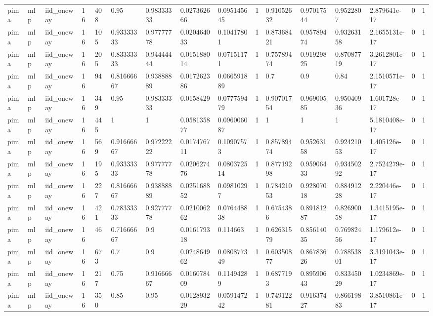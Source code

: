 \begin{tabular}{llllllllllllllll}
pima & mlp & iid\_oneway & 16 & 408 & 0.95 & 0.98333333 & 0.027362666 & 0.095145645 & 1 & 0.91052632 & 0.97017544 & 0.9522807 & 2.879641e-17 & 0 & 1 \\
pima & mlp & iid\_oneway & 16 & 105 & 0.93333333 & 0.97777778 & 0.020464033 & 0.10417801 & 1 & 0.87368421 & 0.95789474 & 0.93263158 & 2.1655131e-17 & 0 & 1 \\
pima & mlp & iid\_oneway & 16 & 205 & 0.83333333 & 0.94444444 & 0.015188014 & 0.07151171 & 1 & 0.75789474 & 0.91929825 & 0.87087719 & 3.2612801e-17 & 0 & 1 \\
pima & mlp & iid\_oneway & 16 & 94 & 0.81666667 & 0.93888889 & 0.017262386 & 0.066591889 & 1 & 0.7 & 0.9 & 0.84 & 2.1510571e-17 & 0 & 1 \\
pima & mlp & iid\_oneway & 16 & 349 & 0.95 & 0.98333333 & 0.0158429 & 0.077759479 & 1 & 0.90701754 & 0.96900585 & 0.95040936 & 1.601728e-17 & 0 & 1 \\
pima & mlp & iid\_oneway & 16 & 445 & 1 & 1 & 0.058135877 & 0.096006087 & 1 & 1 & 1 & 1 & 5.1810408e-17 & 0 & 1 \\
pima & mlp & iid\_oneway & 16 & 569 & 0.91666667 & 0.97222222 & 0.017476711 & 0.10907573 & 1 & 0.85789474 & 0.95263158 & 0.92421053 & 1.405126e-17 & 0 & 1 \\
pima & mlp & iid\_oneway & 16 & 195 & 0.93333333 & 0.97777778 & 0.020627476 & 0.080372514 & 1 & 0.87719298 & 0.95906433 & 0.93450292 & 2.7524279e-17 & 0 & 1 \\
pima & mlp & iid\_oneway & 16 & 227 & 0.81666667 & 0.93888889 & 0.025168852 & 0.09810297 & 1 & 0.78421053 & 0.92807018 & 0.88491228 & 2.220446e-17 & 0 & 1 \\
pima & mlp & iid\_oneway & 16 & 421 & 0.78333333 & 0.92777778 & 0.021006262 & 0.076448838 & 1 & 0.6754386 & 0.89181287 & 0.82690058 & 1.3415195e-17 & 0 & 1 \\
pima & mlp & iid\_oneway & 16 & 46 & 0.71666667 & 0.9 & 0.016179318 & 0.114663 & 1 & 0.62631579 & 0.85614035 & 0.76982456 & 1.179612e-17 & 0 & 1 \\
pima & mlp & iid\_oneway & 16 & 673 & 0.7 & 0.9 & 0.024864962 & 0.080877349 & 1 & 0.60350877 & 0.86783626 & 0.78853801 & 3.3191043e-17 & 0 & 1 \\
pima & mlp & iid\_oneway & 16 & 217 & 0.75 & 0.91666667 & 0.016078409 & 0.11494289 & 1 & 0.6877193 & 0.89590643 & 0.83345029 & 1.0234869e-17 & 0 & 1 \\
pima & mlp & iid\_oneway & 16 & 350 & 0.85 & 0.95 & 0.012893229 & 0.059147242 & 1 & 0.74912281 & 0.91637427 & 0.86619883 & 3.8510861e-17 & 0 & 1 \\

\end{tabular}
